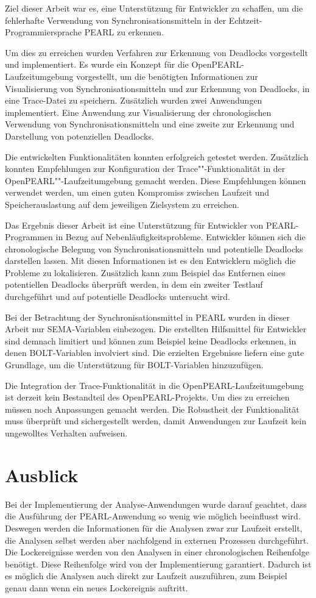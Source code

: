 Ziel dieser Arbeit war es, eine Unterstützung für Entwickler zu schaffen, um die
fehlerhafte Verwendung von Synchronisationsmitteln in der
Echtzeit-Programmiersprache PEARL zu erkennen.

Um dies zu erreichen wurden Verfahren zur Erkennung von Deadlocks vorgestellt
und implementiert. Es wurde ein Konzept für die OpenPEARL-Laufzeitumgebung
vorgestellt, um die benötigten Informationen zur Visualisierung von
Synchronisationsmitteln und zur Erkennung von Deadlocks, in eine Trace-Datei zu
speichern. Zusätzlich wurden zwei Anwendungen implementiert. Eine Anwendung zur
Visualisierung der chronologischen Verwendung von Synchronisationsmitteln und
eine zweite zur Erkennung und Darstellung von potenziellen Deadlocks.

Die entwickelten Funktionalitäten konnten erfolgreich getestet werden.
Zusätzlich konnten Empfehlungen zur Konfiguration der Trace""-Funktionalität in
der OpenPEARL""-Laufzeitumgebung gemacht werden. Diese Empfehlungen können
verwendet werden, um einen guten Kompromiss zwischen Laufzeit und
Speicherauslastung auf dem jeweiligen Zielsystem zu erreichen.

Das Ergebnis dieser Arbeit ist eine Unterstützung für Entwickler von
PEARL-Programmen in Bezug auf Nebenläufigkeitsprobleme. Entwickler können sich
die chronologische Belegung von Synchronisationsmitteln und potentielle
Deadlocks darstellen lassen. Mit diesen Informationen ist es den Entwicklern
möglich die Probleme zu lokalisieren. Zusätzlich kann zum Beispiel das Entfernen
eines potentiellen Deadlocks überprüft werden, in dem ein zweiter Testlauf
durchgeführt und auf potentielle Deadlocks untersucht wird.

Bei der Betrachtung der Synchronisationsmittel in PEARL wurden in dieser Arbeit
nur \textrm{SEMA}-Variablen einbezogen. Die erstellten Hilfsmittel für
Entwickler sind demnach limitiert und können zum Beispiel keine Deadlocks
erkennen, in denen \textrm{BOLT}-Variablen involviert sind. Die erzielten
Ergebnisse liefern eine gute Grundlage, um die Unterstützung für
\textrm{BOLT}-Variablen hinzuzufügen.

Die Integration der Trace-Funktionalität in die OpenPEARL-Laufzeitumgebung ist
derzeit kein Bestandteil des OpenPEARL-Projekts. Um dies zu erreichen müssen
noch Anpassungen gemacht werden. Die Robustheit der Funktionalität muss
überprüft und sichergestellt werden, damit Anwendungen zur Laufzeit kein
ungewolltes Verhalten aufweisen.

\section{Ausblick}
Bei der Implementierung der Analyse-Anwendungen wurde darauf geachtet, dass die
Ausführung der PEARL-Anwendung so wenig wie möglich beeinflusst wird. Deswegen
werden die Informationen für die Analysen zwar zur Laufzeit erstellt, die
Analysen selbst werden aber nachfolgend in externen Prozessen durchgeführt. Die
Lockereignisse werden von den Analysen in einer chronologischen Reihenfolge
benötigt. Diese Reihenfolge wird von der Implementierung garantiert. Dadurch ist
es möglich die Analysen auch direkt zur Laufzeit auszuführen, zum Beispiel genau
dann wenn ein neues Lockereignis auftritt.

